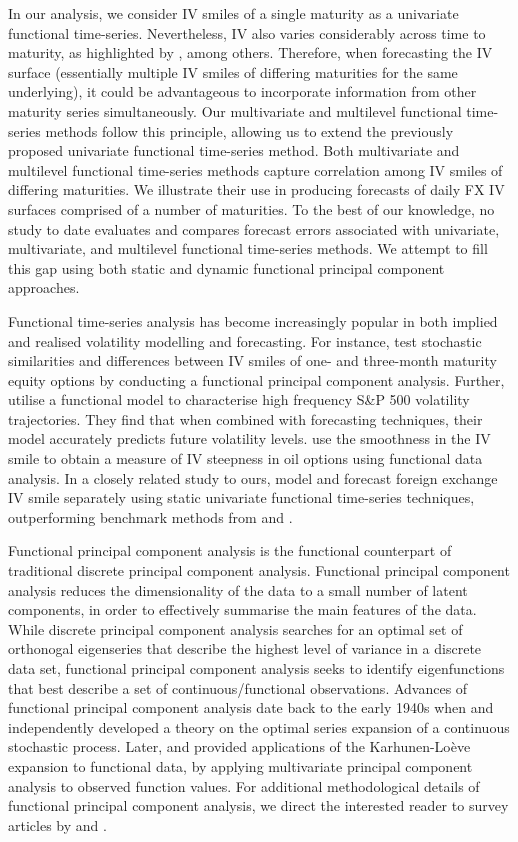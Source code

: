 \documentclass[12pt,a4paper]{article}
\begin{document}
In our analysis, we consider IV smiles of a single maturity as a univariate functional time-series. Nevertheless, IV also varies considerably across time to maturity, as highlighted by \cite{BP09}, among others. Therefore, when forecasting the IV surface (essentially multiple IV smiles of differing maturities for the same underlying), it could be advantageous to incorporate information from other maturity series simultaneously. Our multivariate and multilevel functional time-series methods follow this principle, allowing us to extend the previously proposed univariate functional time-series method. Both multivariate and multilevel functional time-series methods capture correlation among IV smiles of differing maturities. We illustrate their use in producing forecasts of daily FX IV surfaces comprised of a number of maturities. To the best of our knowledge, no study to date evaluates and compares forecast errors associated with univariate, multivariate, and multilevel functional time-series methods. We attempt to fill this gap using both static and dynamic functional principal component approaches.

Functional time-series analysis has become increasingly popular in both implied and realised volatility modelling and forecasting. For instance, \cite{BHK09} test stochastic similarities and differences between IV smiles of one- and three-month maturity equity options by conducting a functional principal component analysis. Further, \cite{MSS11} utilise a functional model to characterise high frequency S\&P 500 volatility trajectories. They find that when combined with forecasting techniques, their model accurately predicts future volatility levels. \cite{KMC15} use the smoothness in the IV smile to obtain a measure of IV steepness in oil options using functional data analysis. In a closely related study to ours, \cite{KCM18} model and forecast foreign exchange IV smile separately using static univariate functional time-series techniques, outperforming benchmark methods from \cite{GG06} and \cite{CT10, CT11}.

Functional principal component analysis is the functional counterpart of traditional discrete principal component analysis. Functional principal component analysis reduces the dimensionality of the data to a small number of latent components, in order to effectively summarise the main features of the data. While discrete principal component analysis searches for an optimal set of orthonogal eigenseries that describe the highest level of variance in a discrete data set, functional principal component analysis seeks to identify eigenfunctions that best describe a set of continuous/functional observations. Advances of functional principal component analysis date back to the early 1940s when \cite{Karhunen46} and \cite{Loeve46} independently developed a theory on the optimal series expansion of a continuous stochastic process. Later, \cite{Rao58} and \cite{Tucker58} provided applications of the Karhunen-Lo\`{e}ve expansion to functional data, by applying multivariate principal component analysis to observed function values. For additional methodological details of functional principal component analysis, we direct the interested reader to survey articles by \cite{Hall11, Shang14} and \cite{WCM16}.
\end{document}
